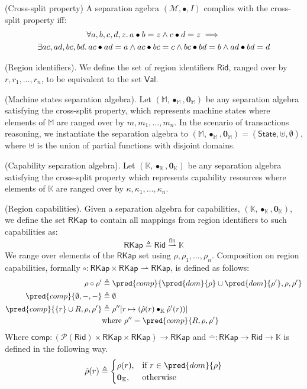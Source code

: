  (Cross-split property) A separation agebra $(\mathcal{M}, \bullet, I)$ complies with the cross-split property iff:
\begin{gather*}
	\forall a, b, c, d, z \ldotp a \bullet b = z \land c \bullet d = z \implies \\ \exists ac, ad, bc, bd \ldotp ac \bullet ad = a \land ac \bullet bc = c \land bc \bullet bd = b \land ad \bullet bd = d
\end{gather*}

 (Region identifiers). We define the set of region identifiers $\mathsf{Rid}$, ranged over by $r, r_1, \ldots, r_n$, to be equivalent to the set $\mathsf{Val}$.

 (Machine states separation algebra). Let $(\mathbb{M}, \bullet_\mathbb{M}, \mathbf{0}_\mathbb{M})$ be any separation algebra satisfying the cross-split property, which represents machine states where elements of $\mathbb{M}$ are ranged over by $m, m_1, \ldots, m_n$. In the scenario of transactions reasoning, we instantiate the separation algebra to $(\mathbb{M}, \bullet_\mathbb{M}, \mathbf{0}_\mathbb{M}) = (\mathsf{State}, \uplus, \emptyset)$, where $\uplus$ is the union of partial functions with disjoint domains.

\param (Capability separation algebra). Let $(\mathbb{K}, \bullet_\mathbb{K}, \mathbf{0}_\mathbb{K})$ be any separation algebra satisfying the cross-split property which represents capability resources where elements of $\mathbb{K}$ are ranged over by $\kappa, \kappa_1, \ldots, \kappa_n$.

 (Region capabilities). Given a separation algebra for capabilities, $(\mathbb{K}, \bullet_\mathbb{K}, \mathbf{0}_\mathbb{K})$, we define the set $\mathsf{RKap}$ to contain all mappings from region identifiers to such capabilities as:
\[
	\mathsf{RKap} \triangleq \mathsf{Rid} \overset{\text{fin}}{\rightharpoonup} \mathbb{K}
\]
We range over elements of the $\mathsf{RKap}$ set using $\rho, \rho_1, \ldots, \rho_n$. Composition on region capabilities, formally $\circ : \mathsf{RKap} \times \mathsf{RKap} \rightharpoonup \mathsf{RKap}$, is defined as follows:
\begin{align*}
	\rho \circ \rho' &\triangleq \pred{comp}{\pred{dom}{\rho} \cup \pred{dom}{\rho'}, \rho, \rho'}
	\\
	\pred{comp}{\emptyset, -, -} &\triangleq \emptyset
	\\
	\pred{comp}{\{r\} \cup R, \rho, \rho'} &\triangleq \rho''[r \mapsto (\hat{\rho}(r) \bullet_\mathbb{K} \hat{\rho}'(r))]
	\\ &\text{where } \rho'' = \pred{comp}{R, \rho, \rho'}
\end{align*}
Where $\mathsf{comp} : \left( \mathcal{P}(\mathsf{Rid}) \times \mathsf{RKap} \times \mathsf{RKap} \right) \rightarrow \mathsf{RKap}$ and $\hat{-} : \mathsf{RKap} \rightarrow \mathsf{Rid} \rightarrow \mathbb{K}$ is defined in the following way.
\[
	\hat{\rho}(r) \triangleq
		\begin{cases}
			\rho(r), & \text{if } r \in \pred{dom}{\rho}
			\\
			\mathbf{0}_\mathbb{K}, & \text{otherwise}
		\end{cases}
\]

